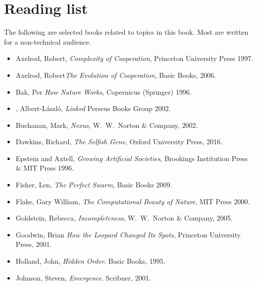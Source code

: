 \documentclass[12pt]{book}
\theoremstyle{exercise}
\begin{document}
\appendix

\chapter{Reading list}
\label{reading}

The following are selected books related to topics in this book.  Most are written for a non-technical audience.


\begin{itemize}

\item Axelrod, Robert,  {\it  Complexity of Cooperation},
Princeton University Press 1997.

\item Axelrod, Robert{\it  The Evolution of Cooperation},
Basic Books, 2006.

\item Bak, Per {\it  How Nature Works},
Copernicus (Springer) 1996.

\item \Barabasi, Albert-L\'{a}szl\'{o}, {\it  Linked}
Perseus Books Group 2002.

\item Buchanan, Mark, {\it  Nexus},
W.~W.~Norton \& Company, 2002.

\item Dawkins, Richard, {\it The Selfish Gene}, Oxford University Press, 2016.

\item Epstein and Axtell, {\it  Growing Artificial Societies},
Brookings Institution Press \& MIT Press 1996.

\item Fisher, Len, {\it  The Perfect Swarm},
Basic Books 2009.

\item Flake, Gary William, {\it  The Computational Beauty of Nature}, MIT Press 2000.

\item Goldstein, Rebecca, {\it Incompleteness}, W.~W.~Norton \& Company, 2005.

\item Goodwin, Brian {\it  How the Leopard Changed Its Spots}, Princeton University Press, 2001.

\item Holland, John, {\it  Hidden Order}.
Basic Books, 1995.

\item Johnson, Steven, {\it  Emergence}.
Scribner, 2001.


\end{itemize}
\end{document}
